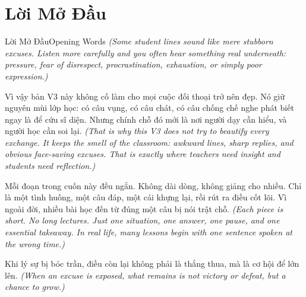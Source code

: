 \chapter*{Lời Mở Đầu}

\begin{truyen}{Lời Mở Đầu}{Opening Words}
\textit{(Some student lines sound like mere stubborn excuses. Listen more carefully and you often hear something real underneath: pressure, fear of disrespect, procrastination, exhaustion, or simply poor expression.)}

Vì vậy bản V3 này không cố làm cho mọi cuộc đối thoại trở nên đẹp. Nó giữ nguyên mùi lớp học: có câu vụng, có câu chát, có câu chống chế nghe phát biết ngay là để cứu sĩ diện. Nhưng chính chỗ đó mới là nơi người dạy cần hiểu, và người học cần soi lại.
\textit{(That is why this V3 does not try to beautify every exchange. It keeps the smell of the classroom: awkward lines, sharp replies, and obvious face-saving excuses. That is exactly where teachers need insight and students need reflection.)}

Mỗi đoạn trong cuốn này đều ngắn. Không dài dòng, không giảng cho nhiều. Chỉ là một tình huống, một câu đáp, một cái khựng lại, rồi rút ra điều cốt lõi. Vì ngoài đời, nhiều bài học đến từ đúng một câu bị nói trật chỗ.
\textit{(Each piece is short. No long lectures. Just one situation, one answer, one pause, and one essential takeaway. In real life, many lessons begin with one sentence spoken at the wrong time.)}
\end{truyen}

\begin{baihoc}
Khi lý sự bị bóc trần, điều còn lại không phải là thắng thua, mà là cơ hội để lớn lên.
\textit{(When an excuse is exposed, what remains is not victory or defeat, but a chance to grow.)}
\end{baihoc}
\ngancach